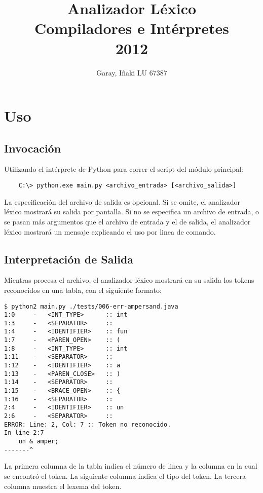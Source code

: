 \documentclass [a4paper,titlepage]{report}
\title{Analizador Léxico \\Compiladores e Intérpretes \\2012}
\author{Garay, I\~{n}aki LU 67387}
\begin{document}
\maketitle

\tableofcontents

\newpage

\section{Uso}

\subsection{Invocación}

Utilizando el intérprete de Python para correr el script del módulo principal:

\begin{verbatim}
    C:\> python.exe main.py <archivo_entrada> [<archivo_salida>]
\end{verbatim}

La especificación del archivo de salida es opcional. 
Si se omite, el analizador léxico mostrará su salida por pantalla.
Si no se especifica un archivo de entrada, o se pasan más argumentos que el 
archivo de entrada y el de salida, el analizador léxico mostrará un mensaje 
explicando el uso por linea de comando.

\subsection{Interpretación de Salida}

Mientras procesa el archivo, el analizador léxico mostrará en su salida los
tokens reconocidos en una tabla, con el siguiente formato:

\begin{verbatim}
$ python2 main.py ./tests/006-err-ampersand.java 
1:0     -   <INT_TYPE>      :: int
1:3     -   <SEPARATOR>     ::  
1:4     -   <IDENTIFIER>    :: fun
1:7     -   <PAREN_OPEN>    :: (
1:8     -   <INT_TYPE>      :: int
1:11    -   <SEPARATOR>     ::  
1:12    -   <IDENTIFIER>    :: a
1:13    -   <PAREN_CLOSE>   :: )
1:14    -   <SEPARATOR>     ::  
1:15    -   <BRACE_OPEN>    :: {
1:16    -   <SEPARATOR>     ::  
2:4     -   <IDENTIFIER>    :: un
2:6     -   <SEPARATOR>     ::  
ERROR: Line: 2, Col: 7 :: Token no reconocido.
In line 2:7
    un & amper;
-------^
\end{verbatim}

La primera columna de la tabla indica el número de linea y la columna en la cual
se encontró el token. La siguiente columna indica el tipo del token. La tercera
columna muestra el lexema del token.
\end{document}
